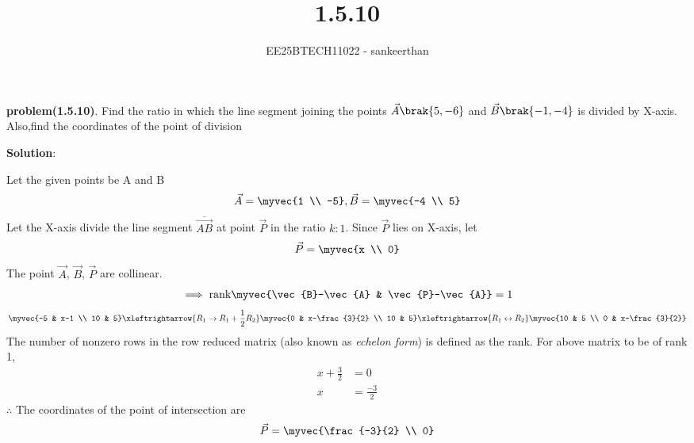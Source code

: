 \documentclass[journal]{IEEEtran}
\begin{document}



\title{1.5.10}
\author{EE25BTECH11022 - sankeerthan}
{\let\newpage\relax\maketitle}

\renewcommand{\thefigure}{\theenumi}
\renewcommand{\thetable}{\theenumi}
\setlength{\intextsep}{10pt} %


\renewcommand{\thetable}{\theenumi}


\textbf{problem(1.5.10)}.
Find the ratio in which the line segment joining the points 
$\vec{A}\brak{5, -6}$ and $\vec{B}\brak{-1, -4}$ is divided by X-axis. Also,find the coordinates of the  point of division

\textbf{Solution}:

Let the given points be A and B
\begin{align*} \vec{A} = \myvec{1 \\ -5}, \vec{B} = \myvec{-4 \\ 5} \end{align*}
Let the X-axis divide the line segment \(\overline{\vec{AB}}\) at point $\vec{P}$ in the ratio $k:1$.
Since $\vec{P}$ lies on X-axis, let
\begin{align*}
\vec{P} = \myvec{x \\ 0}
\end{align*}
The point $\vec{A}$, $\vec{B}$, $\vec{P}$ are collinear.
\begin{align}
\implies \text{rank}\myvec{\vec{B}-\vec{A} & \vec{P}-\vec{A}} = 1
\end{align}
\begin{align}
\myvec{-5 & x-1 \\ 10 & 5} \xleftrightarrow{R_1 \rightarrow {R_1 + \frac{1}{2}R_2}}\myvec{0 & x-\frac{3}{2} \\ 10 & 5} \xleftrightarrow{R_1 \leftrightarrow R_2}  \myvec{10 & 5 \\ 0 & x-\frac{3}{2}}
\end{align}
The number of nonzero rows in the row reduced matrix (also known as {\em echelon form}) is defined as the rank. For above matrix to be of rank 1,
\begin{align}
x+\frac{3}{2} &= 0 \\
x &= \frac{-3}{2}
\end{align}
$\therefore$ The coordinates of the point of intersection are 
\begin{align*}
\vec{P} = \myvec{\frac{-3}{2} \\ 0}
\end{align*}
\end{document}
